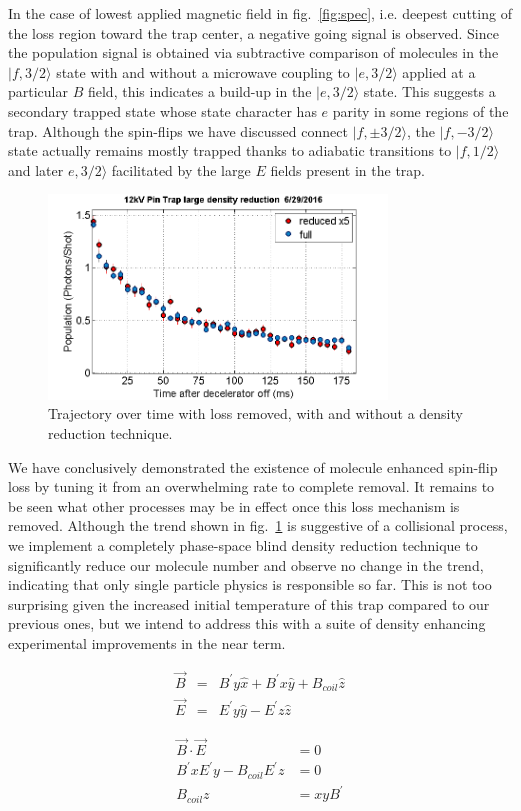 \documentclass[%
 reprint,
 amsmath,amssymb,
 aps,
prl,
]{revtex4-1}
\begin{document}
In the case of lowest applied magnetic field in fig.~\ref{fig:spec}, i.e. deepest cutting of the loss region toward the trap center, a negative going signal is observed. Since the population signal is obtained via subtractive comparison of molecules in the $|f,3/2\rangle$ state with and without a microwave coupling to $|e,3/2\rangle$ applied at a particular $B$ field, this indicates a build-up in the $|e,3/2\rangle$ state. This suggests a secondary trapped state whose state character has $e$ parity in some regions of the trap. Although the spin-flips we have discussed connect $|f,\pm3/2\rangle$, the $|f,-3/2\rangle$ state actually remains mostly trapped thanks to adiabatic transitions to $|f,1/2\rangle$ and later $e,3/2\rangle$ facilitated by the large $E$ fields present in the trap. 

\begin{figure}
\includegraphics[width=90mm]{reduce-density-compare.png}%
\caption{
Trajectory over time with loss removed, with and without a density reduction technique.
\label{fig:timetrace}}
\end{figure}

We have conclusively demonstrated the existence of molecule enhanced spin-flip loss by tuning it from an overwhelming rate to complete removal. It remains to be seen what other processes may be in effect once this loss mechanism is removed. Although the trend shown in fig.~\ref{fig:timetrace} is suggestive of a collisional process, we implement a completely phase-space blind density reduction technique to significantly reduce our molecule number and observe no change in the trend, indicating that only single particle physics is responsible so far. This is not too surprising given the increased initial temperature of this trap compared to our previous ones, but we intend to address this with a suite of density enhancing experimental improvements in the near term.

\begin{eqnarray}
\vec{B} &=&  B^\prime y\hat{x}+ B^\prime x\hat{y} + B_{coil} \hat{z}\\
\vec{E} &=&  E^\prime y\hat{y}-  E^\prime z\hat{z}
\end{eqnarray}

\begin{eqnarray}
\vec{B}\cdot \vec{E} &= 0\\
B^\prime x E^\prime y - B_{coil}  E^\prime z &= 0\\
B_{coil}z &= xyB^\prime
\end{eqnarray}


\nocite{*}


\end{document}
